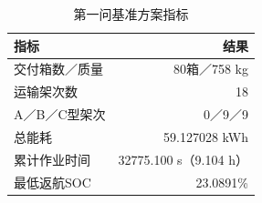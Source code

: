\begin{table}[htbp]
\centering
\caption{第一问基准方案指标}
\label{tab:q1:baseline}
\begin{tabular}{lr}
\toprule
指标 & 结果 \\
\midrule
交付箱数／质量 & 80箱／758 kg \\
运输架次数 & 18 \\
A／B／C型架次 & 0／9／9 \\
总能耗 & 59.127028 kWh \\
累计作业时间 & 32775.100 s（9.104 h） \\
最低返航SOC & 23.0891\% \\
\bottomrule
\end{tabular}
\end{table}
